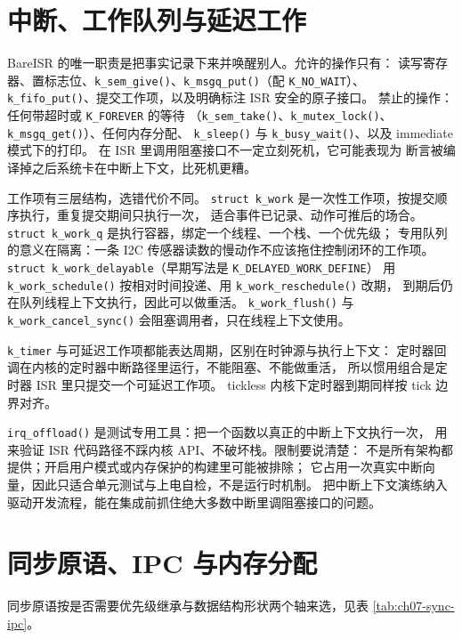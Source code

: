 \documentclass[12pt,a4paper,fontset=fandol]{ctexbook}
\newcommand{\Fn}[1]{\texttt{#1()}}
\newcommand{\Tp}[1]{\texttt{#1}}
\newcommand{\Bk}{\discretionary{}{}{}}
\newcommand{\Lang}[1]{\textsf{#1}}
\newcommand{\DomBare}{\Lang{Bare}}
\begin{document}
\section{中断、工作队列与延迟工作}
\label{sec:ch07-irq-work}

\DomBare{}ISR 的唯一职责是把事实记录下来并唤醒别人。允许的操作只有：
读写寄存器、置标志位、\Fn{k\_sem\_give}、\Fn{k\_msgq\_put}（配 \Tp{K\_NO\_WAIT}）、
\Fn{k\_fifo\_put}、提交工作项，以及明确标注 ISR 安全的原子接口。
禁止的操作：任何带超时或 \Tp{K\_FOREVER} 的等待
（\Fn{k\_sem\_take}、\Fn{k\_mutex\_lock}、\Fn{k\_msgq\_get}）、任何内存分配、
\Fn{k\_sleep} 与 \Fn{k\_busy\_wait}、以及 immediate 模式下的打印。
在 ISR 里调用阻塞接口不一定立刻死机，它可能表现为
断言被编译掉之后系统卡在中断上下文，比死机更糟。

工作项有三层结构，选错代价不同。
\Tp{struct k\_{\Bk}work} 是一次性工作项，按提交顺序执行，重复提交期间只执行一次，
适合事件已记录、动作可推后的场合。
\Tp{struct k\_{\Bk}work\_{\Bk}q} 是执行容器，绑定一个线程、一个栈、一个优先级；
专用队列的意义在隔离：一条 I2C 传感器读数的慢动作不应该拖住控制闭环的工作项。
\Tp{struct k\_{\Bk}work\_{\Bk}delayable}（早期写法是 \Tp{K\_{\Bk}DELAYED\_{\Bk}WORK\_{\Bk}DEFINE}）
用 \Fn{k\_{\Bk}work\_{\Bk}schedule} 按相对时间投递、用 \Fn{k\_{\Bk}work\_{\Bk}reschedule} 改期，
到期后仍在队列线程上下文执行，因此可以做重活。
\Fn{k\_{\Bk}work\_{\Bk}flush} 与 \Fn{k\_{\Bk}work\_{\Bk}cancel\_{\Bk}sync} 会阻塞调用者，只在线程上下文使用。

\Tp{k\_timer} 与可延迟工作项都能表达周期，区别在时钟源与执行上下文：
定时器回调在内核的定时器中断路径里运行，不能阻塞、不能做重活，
所以惯用组合是定时器 ISR 里只提交一个可延迟工作项。
tickless 内核下定时器到期同样按 tick 边界对齐。

\Fn{irq\_offload} 是测试专用工具：把一个函数以真正的中断上下文执行一次，
用来验证 ISR 代码路径不踩内核 API、不破坏栈。限制要说清楚：
不是所有架构都提供；开启用户模式或内存保护的构建里可能被排除；
它占用一次真实中断向量，因此只适合单元测试与上电自检，不是运行时机制。
把中断上下文演练纳入驱动开发流程，能在集成前抓住绝大多数中断里调阻塞接口的问题。

\section{同步原语、IPC 与内存分配}
\label{sec:ch07-sync-ipc}

同步原语按是否需要优先级继承与数据结构形状两个轴来选，见表 \ref{tab:ch07-sync-ipc}。
\end{document}
